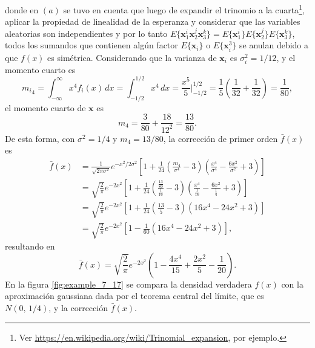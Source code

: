 \documentclass[a4paper]{report}
\newcommand{\x}{\mathbf{x}}
\begin{document}
donde en \((a)\) se tuvo en cuenta que luego de expandir el trinomio a la cuarta\footnote{Ver \url{https://en.wikipedia.org/wiki/Trinomial_expansion}, por ejemplo.}, aplicar la propiedad de linealidad de la esperanza y considerar que las variables aleatorias son independientes y por lo tanto \(E\{\x_1^i\x_2^j\x_3^k\}=E\{\x_1^i\}E\{\x_2^j\}E\{\x_3^k\}\), todos los sumandos que contienen algún factor \(E\{\x_i\}\) o \(E\{\x_i^3\}\) se anulan debido a que \(f(x)\) es simétrica. Considerando que la varianza de \(\x_i\) es \(\sigma_i^2=1/12\), y el momento cuarto es
\[
 {m_i}_4=\int_{-\infty}^{\infty}x^4f_i(x)\,dx=\int_{-1/2}^{1/2}x^4\,dx=\frac{x^5}{5}\bigg|_{-1/2}^{1/2}
 =\frac{1}{5}\left(\frac{1}{32}+\frac{1}{32}\right)=\frac{1}{80},
\]
el momento cuarto de \(\x\) es
\[
 m_4=\frac{3}{80}+\frac{18}{12^2}=\frac{13}{80}.
\]
De esta forma, con \(\sigma^2=1/4\) y \(m_4=13/80\), la corrección de primer orden \(\bar{f}(x)\) es
\begin{align*}
 \bar{f}(x)&=\frac{1}{\sqrt{2\pi\sigma^2}}e^{-x^2/2\sigma^2}\left[1+\frac{1}{24}\left(\frac{m_4}{\sigma^4}-3\right)\left(\frac{x^4}{\sigma^4}-\frac{6x^2}{\sigma^2}+3\right)\right]\\
   &=\sqrt{\frac{2}{\pi}}e^{-2x^2}\left[1+\frac{1}{24}\left(\frac{\frac{13}{80}}{\frac{1}{16}}-3\right)\left(\frac{x^4}{\frac{1}{16}}-\frac{6x^2}{\frac{1}{4}}+3\right)\right]\\
   &=\sqrt{\frac{2}{\pi}}e^{-2x^2}\left[1+\frac{1}{24}\left(\frac{13}{5}-3\right)\left(16x^4-24x^2+3\right)\right]\\
   &=\sqrt{\frac{2}{\pi}}e^{-2x^2}\left[1-\frac{1}{60}\left(16x^4-24x^2+3\right)\right],
\end{align*}
resultando en
\[
 \bar{f}(x)=\sqrt{\frac{2}{\pi}}e^{-2x^2}\left(1-\frac{4x^4}{15}+\frac{2x^2}{5}-\frac{1}{20}\right).
\]
En la figura \ref{fig:example_7_17} se compara la densidad verdadera \(f(x)\) con la aproximación gaussiana dada por el teorema central del límite, que es \(N(0,\,1/4)\), y la corrección \(\bar{f}(x)\).
\end{document}

